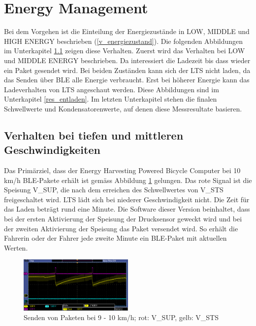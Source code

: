 \section{Energy Management}

Bei dem Vorgehen ist die Einteilung der Energiezustände in LOW, MIDDLE und HIGH ENERGY beschrieben (\ref{v_energiezustand}). Die folgenden Abbildungen im Unterkapitel \ref{tiefes_v} zeigen diese Verhalten. Zuerst wird das Verhalten bei LOW und MIDDLE ENERGY beschrieben. Da interessiert die Ladezeit bis dass wieder ein Paket gesendet wird. Bei beiden Zuständen kann sich der LTS nicht laden, da das Senden über BLE alle Energie verbraucht. Erst bei höherer Energie kann das Ladeverhalten von LTS angeschaut werden. Diese Abbildungen sind im Unterkapitel \ref{res_entladen}. Im letzten Unterkapitel stehen die finalen Schwellwerte und Kondensatorenwerte, auf denen diese Messresultate basieren.

\subsection{Verhalten bei tiefen und mittleren Geschwindigkeiten}
\label{tiefes_v}


Das Primärziel, dass der Energy Harvesting Powered Bicycle Computer bei 10 km/h BLE-Pakete erhält ist gemäss Abbildung \ref{paket_100kmh} gelungen. Das rote Signal ist die Speisung V\_SUP, die nach dem erreichen des Schwellwertes von V\_STS freigeschaltet wird. LTS lädt sich bei niederer Geschwindigkeit nicht. Die Zeit für das Laden beträgt rund eine Minute. Die Software dieser Version beinhaltet, dass bei der ersten Aktivierung der Speisung der Drucksensor geweckt wird  und bei der zweiten Aktivierung der Speisung das Paket versendet wird. So erhält die Fahrerin oder der Fahrer jede zweite Minute ein BLE-Paket mit aktuellen Werten.

\begin{figure}[ht]
   \includegraphics[width=0.5\textwidth]{4Resultate/imag/pic_3.PNG}
    \caption{Senden von Paketen bei 9 - 10 km/h; rot: V\_SUP, gelb: V\_STS}
    \label{paket_100kmh}
\end{figure}

